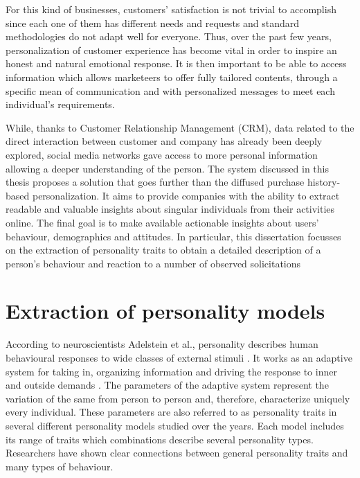 For this kind of businesses, customers' satisfaction is not trivial to accomplish since each one of them has different needs and requests and standard methodologies do not adapt well for everyone.
Thus, over the past few years, personalization of customer experience has become vital in order to inspire an honest and natural emotional response.
It is then important to be able to access information which allows marketeers to offer fully tailored contents, through a specific mean of communication and with personalized messages to meet each individual's requirements.

While, thanks to Customer Relationship Management (CRM), data related to the direct interaction between customer and company has already been deeply explored, social media networks gave access to more personal information allowing a deeper understanding of the person.
The system discussed in this thesis proposes a solution that goes further than the diffused purchase history-based personalization.
It aims to provide companies with the ability to extract readable and valuable insights about singular individuals from their activities online.
The final goal is to make available actionable insights about users' behaviour, demographics and attitudes.
In particular, this dissertation focusses on the extraction of personality traits to obtain a detailed description of a person's behaviour and reaction to a number of observed solicitations

\section{Extraction of personality models}
According to neuroscientists Adelstein et al., personality describes human behavioural responses to wide classes of external stimuli \cite{adelstein2011personality}. It works as an adaptive system for taking in, organizing information and driving the response to inner and outside demands \cite{block2002personality}.
The parameters of the adaptive system represent the variation of the same from person to person and, therefore, characterize uniquely every individual. These parameters are also referred to as personality traits in several different personality models studied over the years.
Each model includes its range of traits which combinations describe several personality types.
Researchers have shown clear connections between general personality traits and many types of behaviour.


